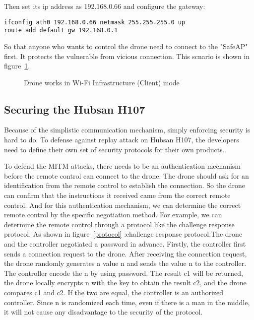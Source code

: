 \documentclass{acm_proc_article-sp}
\begin{document}
Then set its ip address as 192.168.0.66 and configure the gateway:

\begin{lstlisting}
ifconfig ath0 192.168.0.66 netmask 255.255.255.0 up
route add default gw 192.168.0.1
\end{lstlisting}

So that anyone who wants to control the drone need to connect to the "SafeAP" first. It protects the vulnerable from vicious connection. This scnario is shown in figure~\ref{client}.

\begin{figure}
\centering
{}
\caption{Drone works in Wi-Fi Infrastructure (Client) mode}
\label{client}
\end{figure}

\subsection{Securing the Hubsan H107}

Because of the simplistic communication mechanism, simply enforcing security is hard to do. To defense against replay attack on Hubsan H107, the developers need to define their own set of security protocols for their own products.
 
 To defend the MITM attacks, there needs to be an authentication mechanism before the remote control can connect to the drone. The drone should ask for an identification from the remote control to establish the connection. So the drone can confirm that the instructions it received came from the correct remote control. And for this authentication mechanism, we can determine the correct remote control by the specific negotiation method. For example, we can determine the remote control through a protocol like the challenge response protocol. As shown in figure~\ref{protocol} :challenge response protocol.The drone and the controller negotiated a password in advance. Firstly, the controller first sends a connection request to the drone. After receiving the connection request, the drone randomly generates a value n and sends the value n to the controller. The controller encode the n by using password. The result c1 will be returned, the drone locally encrypts n with the key to obtain the result c2, and the drone compares c1 and c2. If the two are equal, the controller is an authorized controller. Since n is randomized each time, even if there is a man in the middle, it will not cause any disadvantage to the security of the protocol.
\end{document}
